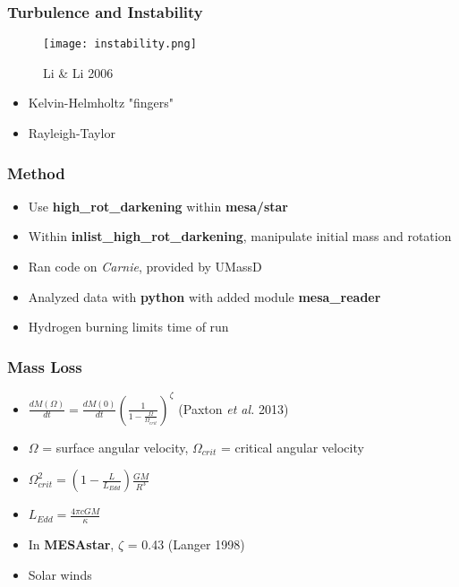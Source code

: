 \documentclass{beamer}
\begin{document}

\begin{frame}
\frametitle{Turbulence and Instability}
\begin{figure}
    \begin{center}
      \texttt{[image: instability.png]}
	    \caption{Li \& Li 2006}
    \end{center}
  \end{figure}

\begin{itemize}
\item Kelvin-Helmholtz "fingers" 
\item Rayleigh-Taylor
\end{itemize}
\end{frame}



\begin{frame}
\frametitle{Method}

\begin{itemize}
	\item Use \textbf{high\_rot\_darkening} within \textbf{mesa/star}
	\item Within \textbf{inlist\_high\_rot\_darkening}, manipulate initial mass and rotation
	\item Ran code on \textit{Carnie}, provided by UMassD
	\item Analyzed data with \textbf{python} with added module \textbf{mesa\_reader}
	\item Hydrogen burning limits time of run
\end{itemize}

\end{frame}

\begin{frame}
\frametitle{Mass Loss}
  \begin{itemize}
	  \item $\frac{dM(\Omega)}{dt} = \frac{dM(0)}{dt}(\frac{1}{1-\frac{\Omega}{\Omega_{crit}}})^\zeta$ (Paxton \textit{et al.} 2013) 
    \item $\Omega$ = surface angular velocity, $\Omega_{crit}$ = critical angular velocity
    \item $\Omega_{crit}^2 = (1 - \frac{L}{L_{Edd}})\frac{GM}{R^3}$
    \item $L_{Edd} = \frac{4\pi cGM}{\kappa}$
    \item In \textbf{MESAstar}, $\zeta$ = 0.43 (Langer 1998)
    \item Solar winds	    
	  
  \end{itemize}
\end{frame}
\end{document}
